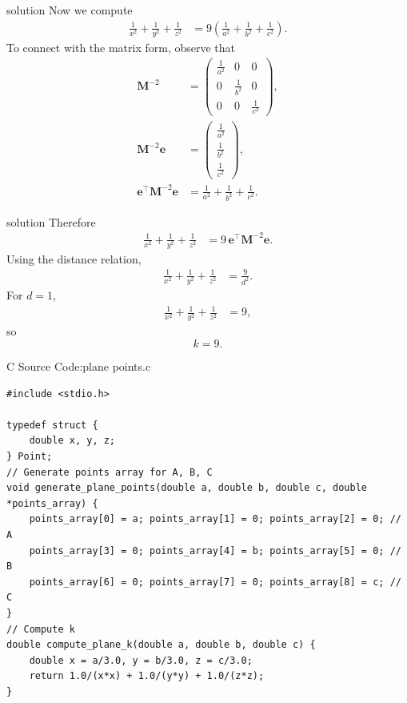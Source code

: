 \documentclass{beamer}
\numberwithin{equation}{section}
\theoremstyle{remark}
\newcommand{\myvec}[1]{\ensuremath{\begin{pmatrix}#1\end{pmatrix}}}
\let\vec\mathbf
\begin{document}
\begin{frame}{solution}
Now we compute
\begin{align}
\frac{1}{x^2}+\frac{1}{y^2}+\frac{1}{z^2}
&= 9\left(\frac{1}{a^2}+\frac{1}{b^2}+\frac{1}{c^2}\right).
\end{align}
To connect with the matrix form, observe that
\begin{align}
\vec{M}^{-2} &= \myvec{\tfrac{1}{a^2}&0&0\\[4pt]0&\tfrac{1}{b^2}&0\\[4pt]0&0&\tfrac{1}{c^2}}, \\[6pt]
\vec{M}^{-2}\vec{e} &= \myvec{\tfrac{1}{a^2}\\[4pt]\tfrac{1}{b^2}\\[4pt]\tfrac{1}{c^2}}, \\[6pt]
\vec{e}^\top \vec{M}^{-2}\vec{e} &= \frac{1}{a^2}+\frac{1}{b^2}+\frac{1}{c^2}.
\end{align}
\end{frame}
\begin{frame}{solution}
Therefore
\begin{align}
\frac{1}{x^2}+\frac{1}{y^2}+\frac{1}{z^2}
&= 9\,\vec{e}^\top \vec{M}^{-2} \vec{e}.
\end{align}
Using the distance relation,
\begin{align}
\frac{1}{x^2}+\frac{1}{y^2}+\frac{1}{z^2} &= \frac{9}{d^2}.
\end{align}
For $d=1$,
\begin{align}
\frac{1}{x^2}+\frac{1}{y^2}+\frac{1}{z^2} &= 9,
\end{align}
so
\[
\boxed{k=9}.
\]

\end{frame}

\begin{frame}[fragile]{C Source Code:plane points.c}
\begin{verbatim}
#include <stdio.h>

typedef struct {
    double x, y, z;
} Point;
// Generate points array for A, B, C
void generate_plane_points(double a, double b, double c, double *points_array) {
    points_array[0] = a; points_array[1] = 0; points_array[2] = 0; // A
    points_array[3] = 0; points_array[4] = b; points_array[5] = 0; // B
    points_array[6] = 0; points_array[7] = 0; points_array[8] = c; // C
}
// Compute k
double compute_plane_k(double a, double b, double c) {
    double x = a/3.0, y = b/3.0, z = c/3.0;
    return 1.0/(x*x) + 1.0/(y*y) + 1.0/(z*z);
}


\end{verbatim}
\end{frame}
\end{document}
